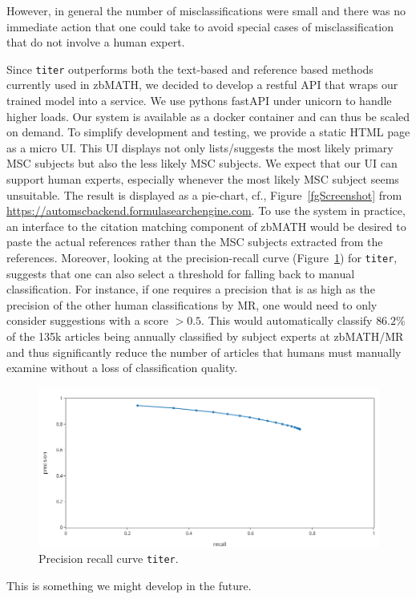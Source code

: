 However, in general the number of misclassifications were small and there was no immediate action that one could take to avoid special cases of misclassification that do not involve a human expert.

Since \texttt{titer} outperforms both the text-based and reference based methods currently used in zbMATH, we decided to develop a restful API that wraps our trained model into a service.
We use pythons fastAPI under unicorn to handle higher loads.
Our system is available as a docker container and can thus be scaled on demand.
To simplify development and testing, we provide a static HTML page as a micro UI.
This UI displays not only lists/suggests the most likely primary MSC subjects but also the less likely MSC subjects.
We expect that our UI can support human experts, especially whenever the most likely MSC subject seems unsuitable.
The result is displayed as a pie-chart, cf., Figure~\ref{fgScreenshot} from \url{https://automscbackend.formulasearchengine.com}.
To use the system in practice, an interface to the citation matching component of zbMATH would be desired to paste the actual references rather than the MSC subjects extracted from the references.
Moreover, looking at the precision-recall curve (Figure~\ref{fgPR}) for \texttt{titer}, suggests that one can also select a threshold for falling back to manual classification.
For instance, if one requires a precision that is as high as the precision of the other human classifications by MR, one would need to only consider suggestions with a score \(> 0.5\).
This would automatically classify \(86.2\%\) of the 135k articles being annually classified by subject experts at zbMATH/MR and thus significantly reduce the number of articles that humans must manually examine without a loss of classification quality.

\begin{figure}[t]
  \centering
  \includegraphics[width=.7\textwidth]{prcurve.png}
  \caption{Precision recall curve \texttt{titer}.}
  \label{fgPR}
\end{figure}
This is something we might develop in the future.


